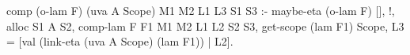 \begin{elpicode}
  comp (o-lam F) (uva A Scope) M1 M2 L1 L3 S1 S3 :-
    maybe-eta (o-lam F) [], !,
      alloc S1 A S2,
      comp-lam F F1 M1 M2 L1 L2 S2 S3,
      get-scope (lam F1) Scope, 
      L3 = [val (link-eta (uva A Scope) (lam F1)) | L2].
\end{elpicode}
